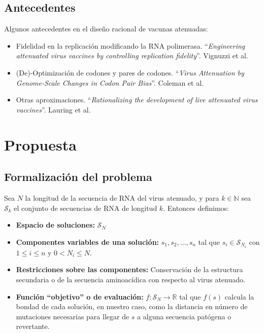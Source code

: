 \documentclass{beamer}
\begin{document}
\subsection{Antecedentes}
\begin{frame}
Algunos antecedentes en el dise\~no racional de vacunas atenuadas:
 \begin{itemize}
  \item Fidelidad en la replicaci\'on modificando la RNA polimerasa.
``\textit{Engineering attenuated virus vaccines by controlling replication
fidelity}''. Vignuzzi et al. 
  \item (De)-Optimizaci\'on de codones y pares de codones.
``\textit{Virus Attenuation by Genome-Scale Changes in Codon Pair Bias}''.
Coleman et al.
  \item Otras aproximaciones. ``\textit{Rationalizing the development of live
attenuated virus vaccines}''. Lauring et al.
 \end{itemize}
\end{frame}

\section{Propuesta}
\subsection{Formalizaci\'on del problema}
\begin{frame}
Sea $N$ la longitud de la secuencia de RNA del virus atenuado, y para $k
\in \mathbb{N}$ sea $\mathcal{S}_{k}$ el conjunto de secuencias de RNA de
longitud $k$. Entonces definimos:

\begin{itemize} 
 \item \textbf{Espacio de soluciones:} $\mathcal{S}_{N}$

 \item \textbf{Componentes variables de una soluci\'on:} $s_{1},s_{2}, \dots,
s_{n}$ tal que $s_{i} \in \mathcal{S}_{N_{i}}$ con $1 \le i \le n$ y $0 < N_{i}
\le N$.

 \item \textbf{Restricciones sobre las componentes:} Conservaci\'on de la
estructura secundaria o de la secuencia aminoac\'idica con respecto al virus
atenuado.

 \item \textbf{Funci\'on ``objetivo'' o de evaluaci\'on:} $f: \mathcal{S}_{N}
\rightarrow \mathbb{R}$ tal que $f(s)$ calcula la bondad de cada soluci\'on, en
nuestro caso, como la distancia en n\'umero de mutaciones necesarias para
llegar de $s$ a alguna secuencia pat\'ogena o revertante.
\end{itemize}
\end{frame}
\end{document}
